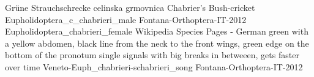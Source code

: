 {Gr\"une Strauchschrecke} %
{celinska grmovnica} %
{Chabrier's Bush-cricket} %
{Eupholidoptera_c_chabrieri_male}  %
{Fontana-Orthoptera-IT-2012} %
{Eupholidoptera_chabrieri_female} %
{Wikipedia Species Pages - German} %
{green with a yellow abdomen, black line from the neck to the front wings, green edge on the bottom of the pronotum} %
{single signals with big breaks in betweeen, gets faster over time} %
{Veneto-Euph_chabrieri-schabrieri_song} %
{Fontana-Orthoptera-IT-2012} %
